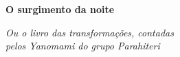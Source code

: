 

\thispagestyle{empty}






\begingroup\thispagestyle{empty}\vspace*{.05\textheight} 

              {\formular
              \huge
              \noindent
              \textbf{O surgimento da noite}\\ 
              
              \vspace{-0.5cm}
              
              }

              \vspace{0.5cm}

              \noindent{}\textit{Ou o livro das transformações, contadas\\pelos Yanomami do  grupo Parahiteri}
                    
\endgroup
\vfill
\pagebreak